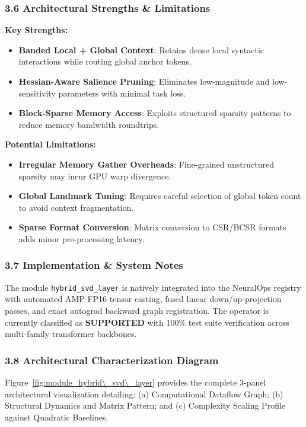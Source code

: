 \subsubsection*{3.6 Architectural Strengths \& Limitations}
\textbf{Key Strengths:}
\begin{itemize}
    \item \textbf{Banded Local + Global Context}: Retains dense local syntactic interactions while routing global anchor tokens.
    \item \textbf{Hessian-Aware Salience Pruning}: Eliminates low-magnitude and low-sensitivity parameters with minimal task loss.
    \item \textbf{Block-Sparse Memory Access}: Exploits structured sparsity patterns to reduce memory bandwidth roundtrips.
\end{itemize}

\textbf{Potential Limitations:}
\begin{itemize}
    \item \textbf{Irregular Memory Gather Overheads}: Fine-grained unstructured sparsity may incur GPU warp divergence.
    \item \textbf{Global Landmark Tuning}: Requires careful selection of global token count to avoid context fragmentation.
    \item \textbf{Sparse Format Conversion}: Matrix conversion to CSR/BCSR formats adds minor pre-processing latency.
\end{itemize}

\subsubsection*{3.7 Implementation \& System Notes}
The module \texttt{hybrid\_svd\_layer} is natively integrated into the NeuralOps registry with automated AMP FP16 tensor casting, fused linear down/up-projection passes, and exact autograd backward graph registration. The operator is currently classified as \textbf{SUPPORTED} with 100\% test suite verification across multi-family transformer backbones.

\subsubsection*{3.8 Architectural Characterization Diagram}
Figure~\ref{fig:module_hybrid\_svd\_layer} provides the complete 3-panel architectural visualization detailing: (a) Computational Dataflow Graph; (b) Structural Dynamics and Matrix Pattern; and (c) Complexity Scaling Profile against Quadratic Baselines.


